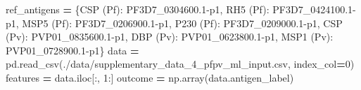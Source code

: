 \documentclass[
  11pt,
  oneside]{book}
\newenvironment{Shaded}{\begin{snugshade}}{\end{snugshade}}
\newcommand{\DecValTok}[1]{\textcolor[rgb]{0.00,0.00,0.81}{#1}}
\newcommand{\NormalTok}[1]{#1}
\newcommand{\OperatorTok}[1]{\textcolor[rgb]{0.81,0.36,0.00}{\textbf{#1}}}
\newcommand{\StringTok}[1]{\textcolor[rgb]{0.31,0.60,0.02}{#1}}
\begin{document}
\begin{Shaded}
\begin{Highlighting}[]
\NormalTok{ref\_antigens }\OperatorTok{=}\NormalTok{ \{}\StringTok{\textquotesingle{}CSP (Pf)\textquotesingle{}}\NormalTok{: }\StringTok{\textquotesingle{}PF3D7\_0304600.1{-}p1\textquotesingle{}}\NormalTok{, }\StringTok{\textquotesingle{}RH5 (Pf)\textquotesingle{}}\NormalTok{: }\StringTok{\textquotesingle{}PF3D7\_0424100.1{-}p1\textquotesingle{}}\NormalTok{, }\StringTok{\textquotesingle{}MSP5 (Pf)\textquotesingle{}}\NormalTok{: }\StringTok{\textquotesingle{}PF3D7\_0206900.1{-}p1\textquotesingle{}}\NormalTok{,}
                \StringTok{\textquotesingle{}P230 (Pf)\textquotesingle{}}\NormalTok{: }\StringTok{\textquotesingle{}PF3D7\_0209000.1{-}p1\textquotesingle{}}\NormalTok{,}
                \StringTok{\textquotesingle{}CSP (Pv)\textquotesingle{}}\NormalTok{: }\StringTok{\textquotesingle{}PVP01\_0835600.1{-}p1\textquotesingle{}}\NormalTok{, }\StringTok{\textquotesingle{}DBP (Pv)\textquotesingle{}}\NormalTok{: }\StringTok{\textquotesingle{}PVP01\_0623800.1{-}p1\textquotesingle{}}\NormalTok{, }\StringTok{\textquotesingle{}MSP1 (Pv)\textquotesingle{}}\NormalTok{: }\StringTok{\textquotesingle{}PVP01\_0728900.1{-}p1\textquotesingle{}}\NormalTok{\}}
\NormalTok{data }\OperatorTok{=}\NormalTok{ pd.read\_csv(}\StringTok{\textquotesingle{}./data/supplementary\_data\_4\_pfpv\_ml\_input.csv\textquotesingle{}}\NormalTok{, index\_col}\OperatorTok{=}\DecValTok{0}\NormalTok{)}
\NormalTok{features }\OperatorTok{=}\NormalTok{ data.iloc[:, }\DecValTok{1}\NormalTok{:]}
\NormalTok{outcome }\OperatorTok{=}\NormalTok{ np.array(data.antigen\_label)}


\end{Highlighting}
\end{Shaded}
\end{document}
